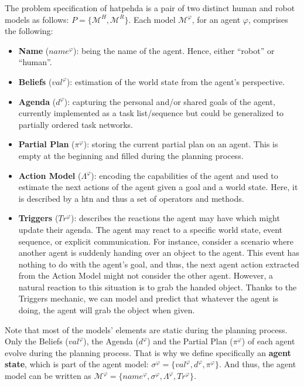 The problem specification of \acrshort{hatpehda} is a pair of two distinct human and robot models as follows: $P = \{ \mathcal{M}^H, \mathcal{M}^R \}$. Each model $\mathcal{M}^\varphi$, for an agent $\varphi$, comprises the following:
\begin{itemize}
    \item \textbf{Name} ($name^{\varphi}$): being the name of the agent. Hence, either ``robot'' or ``human''.
    
    \item \textbf{Beliefs} ($val^{\varphi}$): estimation of the world state from the agent's perspective.
    
    \item \textbf{Agenda} ($d^{\varphi}$): capturing the personal and/or shared goals of the agent, currently implemented as a task list/sequence but could be generalized to partially ordered task networks.
    
    \item \textbf{Partial Plan} ($\pi^{\varphi}$): storing the current partial plan on an agent. This is empty at the beginning and filled during the planning process.
    
    \item \textbf{Action Model} ($\Lambda^{\varphi}$): encoding the capabilities of the agent and used to estimate the next actions of the agent given a goal and a world state. Here, it is described by a \acrfull{htn} and thus a set of operators and methods. 
    
    \item \textbf{Triggers} ($Tr^{\varphi}$): describes the reactions the agent may have which might update their agenda. The agent may react to a specific world state, event sequence, or explicit communication. For instance, consider a scenario where another agent is suddenly handing over an object to the agent. This event has nothing to do with the agent's goal, and thus, the next agent action extracted from the Action Model might not consider the other agent. However, a natural reaction to this situation is to grab the handed object. Thanks to the Triggers mechanic, we can model and predict that whatever the agent is doing, the agent will grab the object when given.  
\end{itemize}

Note that most of the models' elements are static during the planning process. Only the Beliefs ($val^{\varphi}$), the Agenda ($d^{\varphi}$) and the Partial Plan ($\pi^{\varphi}$) of each agent evolve during the planning process. That is why we define specifically an \textbf{agent state}, which is part of the agent model:
$\sigma^{\varphi} = \{ val^{\varphi}, d^{\varphi}, \pi^{\varphi} \}$. 
And thus, the agent model can be written as $\mathcal{M}^{\varphi} = \{ name^{\varphi}, \sigma^{\varphi}, \Lambda^{\varphi}, Tr^{\varphi} \}$.


